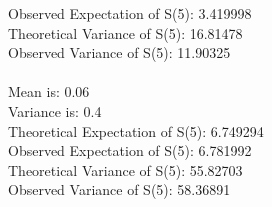 \documentclass[11pt]{article}
\begin{document}
Observed Expectation of S(5):  3.419998 \\
Theoretical Variance of S(5):  16.81478 \\
Observed Variance of S(5):  11.90325 \\
\\
Mean is:  0.06\\ 
Variance is:  0.4\\ 
Theoretical Expectation of S(5):  6.749294\\ 
Observed Expectation of S(5):  6.781992\\ 
Theoretical Variance of S(5):  55.82703\\ 
Observed Variance of S(5):  58.36891 \\
\\
\end{document}
